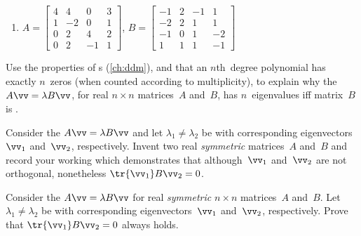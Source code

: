 \begin{reduce}
\begin{exercise}
\begin{enumerate}
\item \(A=\begin{bmatrix} 4 & 4 & 0 & 3
\\ 1 & -2 & 0 & 1
\\ 0 & 2 & 4 & 2
\\ 0 & 2 & -1 & 1 \end{bmatrix}\),
\(B=\begin{bmatrix} -1 & 2 & -1 & 1
\\ -2 & 2 & 1 & 1
\\ -1 & 0 & 1 & -2
\\ 1 & 1 & 1 & -1 \end{bmatrix}\)
  
\end{enumerate}
\end{exercise}


\begin{exercise}  
Use the properties of s (\autoref{ch:ddm}), and that an \(n\)th~degree polynomial has exactly \(n\)~zeros (when counted according to multiplicity), to explain why the  \(A\vv=\lambda B\vv\), for real \(n\times n\) matrices~\(A\) and~\(B\), has \(n\)~eigenvalues iff matrix~\(B\) is .
\end{exercise}


\begin{exercise}  
Consider the  \(A\vv=\lambda B\vv\) and let \(\lambda_1\neq\lambda_2\) be  with corresponding eigenvectors~\(\vv_1\) and~\(\vv_2\), respectively.
Invent two real \emph{symmetric} matrices~\(A\) and~\(B\) and record your working which demonstrates that although~\(\vv_1\) and~\(\vv_2\) are not orthogonal, nonetheless \(\tr{\vv_1}B\vv_2=0\).
\end{exercise}


\begin{exercise} \label{ex:eennmov} 
Consider the  \(A\vv=\lambda B\vv\) for real \emph{symmetric} \(n\times n\) matrices~\(A\) and~\(B\). 
Let \(\lambda_1\neq\lambda_2\) be  with corresponding eigenvectors~\(\vv_1\) and~\(\vv_2\), respectively.
Prove that \(\tr{\vv_1}B\vv_2=0\) always holds.
\end{exercise}



\end{reduce}
